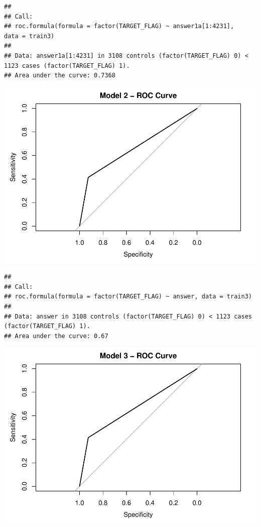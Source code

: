 \documentclass[]{article}
\begin{document}
\begin{verbatim}
## 
## Call:
## roc.formula(formula = factor(TARGET_FLAG) ~ answer1a[1:4231],     data = train3)
## 
## Data: answer1a[1:4231] in 3108 controls (factor(TARGET_FLAG) 0) < 1123 cases (factor(TARGET_FLAG) 1).
## Area under the curve: 0.7368
\end{verbatim}

\includegraphics{DATA621-Homework-4_files/figure-latex/unnamed-chunk-34-6.pdf}

\begin{verbatim}
## 
## Call:
## roc.formula(formula = factor(TARGET_FLAG) ~ answer, data = train3)
## 
## Data: answer in 3108 controls (factor(TARGET_FLAG) 0) < 1123 cases (factor(TARGET_FLAG) 1).
## Area under the curve: 0.67
\end{verbatim}

\includegraphics{DATA621-Homework-4_files/figure-latex/unnamed-chunk-34-7.pdf}
\end{document}
